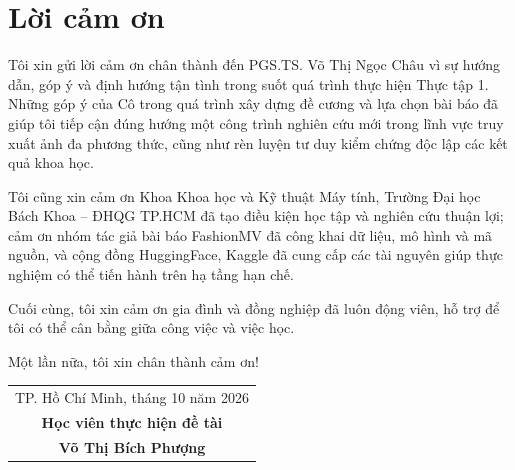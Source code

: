 \chapter*{Lời cảm ơn}

\onehalfspacing
\vspace{1.0cm}

Tôi xin gửi lời cảm ơn chân thành đến PGS.TS. Võ Thị Ngọc Châu vì sự hướng dẫn, góp ý và định hướng tận tình trong suốt quá trình thực hiện Thực tập 1. Những góp ý của Cô trong quá trình xây dựng đề cương và lựa chọn bài báo đã giúp tôi tiếp cận đúng hướng một công trình nghiên cứu mới trong lĩnh vực truy xuất ảnh đa phương thức, cũng như rèn luyện tư duy kiểm chứng độc lập các kết quả khoa học. \par

Tôi cũng xin cảm ơn Khoa Khoa học và Kỹ thuật Máy tính, Trường Đại học Bách Khoa -- ĐHQG TP.HCM đã tạo điều kiện học tập và nghiên cứu thuận lợi; cảm ơn nhóm tác giả bài báo FashionMV đã công khai dữ liệu, mô hình và mã nguồn, và cộng đồng HuggingFace, Kaggle đã cung cấp các tài nguyên giúp thực nghiệm có thể tiến hành trên hạ tầng hạn chế. \par

Cuối cùng, tôi xin cảm ơn gia đình và đồng nghiệp đã luôn động viên, hỗ trợ để tôi có thể cân bằng giữa công việc và việc học. \par

Một lần nữa, tôi xin chân thành cảm ơn!

\begin{flushright}
\begin{tabular}{@{}c@{}}
    TP. Hồ Chí Minh, tháng 10 năm 2026\\
    \textbf{Học viên thực hiện đề tài}\\ [2cm]
    \textbf{Võ Thị Bích Phượng}
\end{tabular}
\end{flushright}
